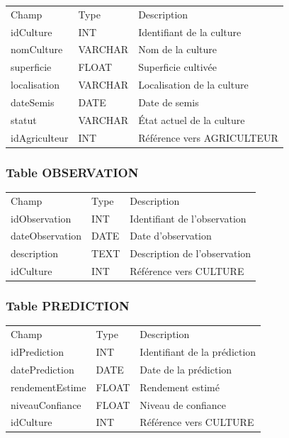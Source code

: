 \documentclass[
]{article}
\begin{document}
\begin{longtable}[]{@{}lll@{}}
\toprule
\endhead
Champ & Type & Description \\
idCulture & INT & Identifiant de la culture \\
nomCulture & VARCHAR & Nom de la culture \\
superficie & FLOAT & Superficie cultivée \\
localisation & VARCHAR & Localisation de la culture \\
dateSemis & DATE & Date de semis \\
statut & VARCHAR & État actuel de la culture \\
idAgriculteur & INT & Référence vers AGRICULTEUR \\
\bottomrule
\end{longtable}

\hypertarget{table-observation}{%
\subsubsection{Table OBSERVATION}\label{table-observation}}

\begin{longtable}[]{@{}lll@{}}
\toprule
\endhead
Champ & Type & Description \\
idObservation & INT & Identifiant de l'observation \\
dateObservation & DATE & Date d'observation \\
description & TEXT & Description de l'observation \\
idCulture & INT & Référence vers CULTURE \\
\bottomrule
\end{longtable}

\hypertarget{table-prediction}{%
\subsubsection{Table PREDICTION}\label{table-prediction}}

\begin{longtable}[]{@{}lll@{}}
\toprule
\endhead
Champ & Type & Description \\
idPrediction & INT & Identifiant de la prédiction \\
datePrediction & DATE & Date de la prédiction \\
rendementEstime & FLOAT & Rendement estimé \\
niveauConfiance & FLOAT & Niveau de confiance \\
idCulture & INT & Référence vers CULTURE \\
\bottomrule
\end{longtable}
\end{document}
